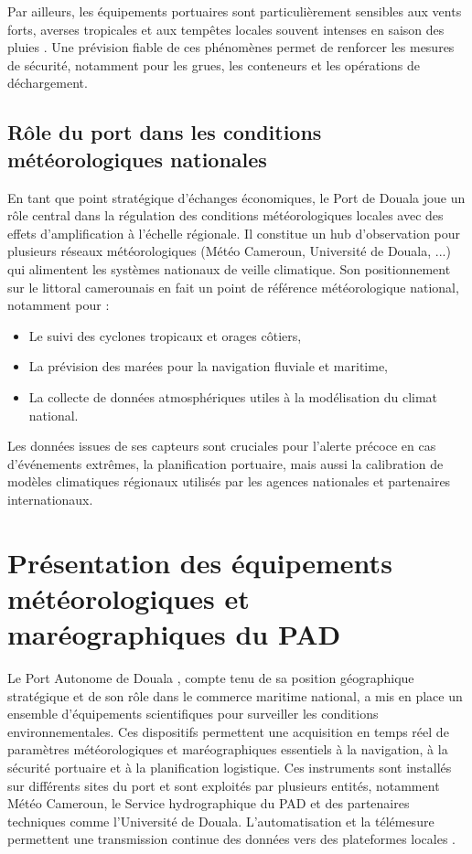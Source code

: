 \documentclass[a4paper,12pt,openany]{report}
\begin{document}
\quad
	Par ailleurs, les équipements portuaires sont particulièrement sensibles aux vents forts, averses tropicales et aux tempêtes locales souvent intenses en saison des pluies . Une prévision fiable de ces phénomènes permet de renforcer les mesures de sécurité, notamment pour les grues,
	 les conteneurs et les opérations de déchargement.
	 
	\subsection{Rôle du port dans les conditions météorologiques nationales}
	En tant que point stratégique d’échanges économiques, le Port de Douala joue un rôle central dans la régulation des conditions météorologiques locales avec des effets d’amplification à l’échelle régionale. Il constitue un hub d’observation pour plusieurs réseaux météorologiques (Météo Cameroun, Université de Douala, ...) qui alimentent les systèmes nationaux de veille climatique.
	Son positionnement sur le littoral camerounais en fait un point de référence météorologique national, notamment pour :\\
\begin{itemize}
	\item Le suivi des cyclones tropicaux et orages côtiers,\\
	\item La prévision des marées pour la navigation fluviale et maritime,\\
	\item La collecte de données atmosphériques utiles à la modélisation du climat national.\\
\end{itemize}

\quad	Les données issues de ses capteurs sont cruciales pour l’alerte précoce en cas d’événements extrêmes, la planification portuaire, mais aussi la calibration de modèles climatiques régionaux utilisés par les agences nationales et partenaires internationaux.

	\section{Présentation des équipements météorologiques et maréographiques du PAD}
	
	\quad
	Le Port Autonome de Douala , compte tenu de sa position géographique stratégique et de son rôle dans le commerce maritime national, a mis en place un ensemble d’équipements scientifiques pour surveiller les conditions environnementales. Ces dispositifs permettent une acquisition en temps réel de paramètres météorologiques et maréographiques essentiels à la navigation, à la sécurité portuaire et à la planification logistique.
	Ces instruments sont installés sur différents sites du port et sont exploités par plusieurs entités, notamment Météo Cameroun, le Service hydrographique du PAD et des partenaires techniques comme l’Université de Douala. L’automatisation et la télémesure permettent une transmission continue des données vers des plateformes locales .
\end{document}
